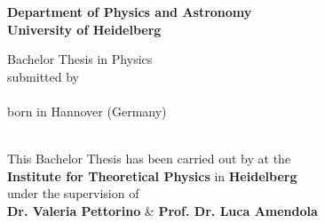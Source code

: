 \begin{titlepage}
\begin{center}
\makeatletter

\Large\textbf{Department of Physics and Astronomy\\
University of Heidelberg}

\vfill

\normalsize
Bachelor Thesis in Physics\\
submitted by\\[0.5cm]
\Large\textbf{\@author}\\[0.2cm]
\normalsize
born in Hannover (Germany)\\[0.5cm]
\Large\textbf{\@date}\\[0.5cm]
\normalsize


\cleardoublepage
\thispagestyle{empty}


\LARGE\textbf{\@title}

\vfill

\normalsize
This Bachelor Thesis has been carried out by \textbf{\@author} at the\\
\textbf{Institute for Theoretical Physics} in \textbf{Heidelberg}\\
under the supervision of\\
\textbf{Dr. Valeria Pettorino} \& \textbf{Prof. Dr. Luca Amendola}

\makeatother
\end{center}
\end{titlepage}
